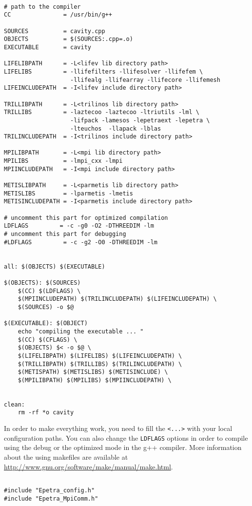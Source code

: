 \begin{verbatim}

# path to the compiler
CC               = /usr/bin/g++

SOURCES          = cavity.cpp
OBJECTS          = $(SOURCES:.cpp=.o)
EXECUTABLE       = cavity

LIFELIBPATH      = -L<lifev lib directory path>
LIFELIBS         = -llifefilters -llifesolver -llifefem \
                   -llifealg -llifearray -llifecore -llifemesh
LIFEINCLUDEPATH  = -I<lifev include directory path>

TRILLIBPATH      = -L<trilinos lib directory path>
TRILLIBS         = -laztecoo -laztecoo -ltriutils -lml \
                   -lifpack -lamesos -lepetraext -lepetra \
                   -lteuchos  -llapack -lblas
TRILINCLUDEPATH  = -I<trilinos include directory path>

MPILIBPATH       = -L<mpi lib directory path>
MPILIBS          = -lmpi_cxx -lmpi
MPIINCLUDEPATH   = -I<mpi include directory path>

METISLIBPATH	 = -L<parmetis lib directory path>
METISLIBS        = -lparmetis -lmetis
METISINCLUDEPATH = -I<parmetis include directory path>

# uncomment this part for optimized compilation
LDFLAGS         = -c -g0 -O2 -DTHREEDIM -lm
# uncomment this part for debugging
#LDFLAGS         = -c -g2 -O0 -DTHREEDIM -lm


all: $(OBJECTS) $(EXECUTABLE)

$(OBJECTS): $(SOURCES)
	$(CC) $(LDFLAGS) \
	$(MPIINCLUDEPATH) $(TRILINCLUDEPATH) $(LIFEINCLUDEPATH) \
	$(SOURCES) -o $@

$(EXECUTABLE): $(OBJECT)
	echo "compiling the executable ... "
	$(CC) $(CFLAGS) \
	$(OBJECTS) $< -o $@ \
	$(LIFELIBPATH) $(LIFELIBS) $(LIFEINCLUDEPATH) \
	$(TRILLIBPATH) $(TRILLIBS) $(TRILINCLUDEPATH) \
	$(METISPATH) $(METISLIBS) $(METISINCLUDE) \
	$(MPILIBPATH) $(MPILIBS) $(MPIINCLUDEPATH) \


clean:
	rm -rf *o cavity

\end{verbatim}


In order to make everything work, you need to fill the \verb|<...>| with your local
configuration paths. You can also change the \verb|LDFLAGS| options in order to
compile using the debug or the optimized mode in the g++ compiler. More information
about the using makefiles are available at \url{http://www.gnu.org/software/make/manual/make.html}.


\begin{verbatim}

#include "Epetra_config.h"
#include "Epetra_MpiComm.h"

\end{verbatim}

